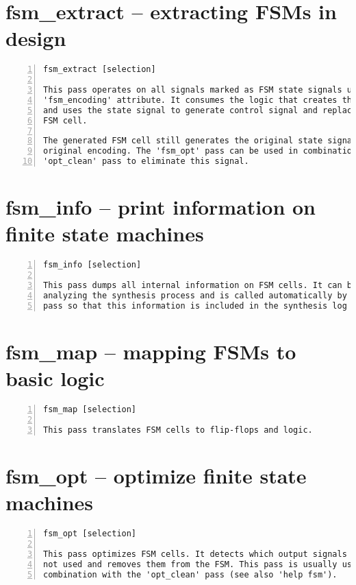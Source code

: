 \section{fsm\_extract -- extracting FSMs in design}
\label{cmd:fsm_extract}
\begin{lstlisting}[numbers=left,frame=single]
    fsm_extract [selection]

This pass operates on all signals marked as FSM state signals using the
'fsm_encoding' attribute. It consumes the logic that creates the state signal
and uses the state signal to generate control signal and replaces it with an
FSM cell.

The generated FSM cell still generates the original state signal with its
original encoding. The 'fsm_opt' pass can be used in combination with the
'opt_clean' pass to eliminate this signal.
\end{lstlisting}

\section{fsm\_info -- print information on finite state machines}
\label{cmd:fsm_info}
\begin{lstlisting}[numbers=left,frame=single]
    fsm_info [selection]

This pass dumps all internal information on FSM cells. It can be useful for
analyzing the synthesis process and is called automatically by the 'fsm'
pass so that this information is included in the synthesis log file.
\end{lstlisting}

\section{fsm\_map -- mapping FSMs to basic logic}
\label{cmd:fsm_map}
\begin{lstlisting}[numbers=left,frame=single]
    fsm_map [selection]

This pass translates FSM cells to flip-flops and logic.
\end{lstlisting}

\section{fsm\_opt -- optimize finite state machines}
\label{cmd:fsm_opt}
\begin{lstlisting}[numbers=left,frame=single]
    fsm_opt [selection]

This pass optimizes FSM cells. It detects which output signals are actually
not used and removes them from the FSM. This pass is usually used in
combination with the 'opt_clean' pass (see also 'help fsm').
\end{lstlisting}


